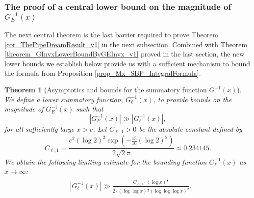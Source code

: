 \documentclass[11pt,reqno,a4letter]{article}
\numberwithin{figure}{section}
\numberwithin{table}{section}
\theoremstyle{plain}
\newtheorem{theorem}{Theorem}
\numberwithin{theorem}{section}
\theoremstyle{definition}
\newcommand{\NBRef}[1]{}
\newcommand{\SuccSim}[0]{\overset{_{\scriptsize{\blacktriangle}}}{\succsim}}
\renewcommand{\SuccSim}[0]{\ensuremath{\gg}}
\begin{document}
\subsubsection{The proof of a central lower bound on the magnitude of $G_{E}^{-1}(x)$} 

The next central theorem is the last barrier required to prove 
Theorem \ref{cor_ThePipeDreamResult_v1} 
in the next subsection. 
Combined with Theorem \ref{theorem_GInvxLowerBoundByGEInvx_v1} 
proved in the last section, the new lower bounds we establish below provide us 
with a sufficient mechanism to bound the formula from 
Proposition \ref{prop_Mx_SBP_IntegralFormula}. 

\begin{theorem}[Asymptotics and bounds for the summatory function $G^{-1}(x)$] 
\label{theorem_gInv_GeneralAsymptoticsForms}
We define a lower summatory function, $G_{\ell}^{-1}(x)$, 
to provide bounds on the magnitude of $G_E^{-1}(x)$ such that 
$$|G_E^{-1}(x)| \gg |G_{\ell}^{-1}(x)|,$$ 
for all sufficiently large $x > e$. 
Let $C_{\ell,1} > 0$ be the absolute constant defined by 
\[
C_{\ell,1} = \frac{e^2 (\log 2)^2 \exp\left(-\frac{15}{16} (\log 2)^2\right)}{2 \sqrt{2} \pi} 
     \approx 0.234145.  
\]
We obtain the following limiting estimate for the bounding function 
$G_{\ell}^{-1}(x)$ as $x \rightarrow \infty$:   
\begin{align*} 
 & \left\lvert G_{\ell}^{-1}\left(x\right) \right\rvert
     \SuccSim 
     \frac{C_{\ell,1} \cdot (\log x)^{\frac{5}{4}}}{2 \cdot  
     (\log\log x)^{\frac{5}{2}} (\log\log\log x)^2}. 
\end{align*} 
\end{theorem} 
\NBRef{A10-2020.04-26} 
\end{document}
